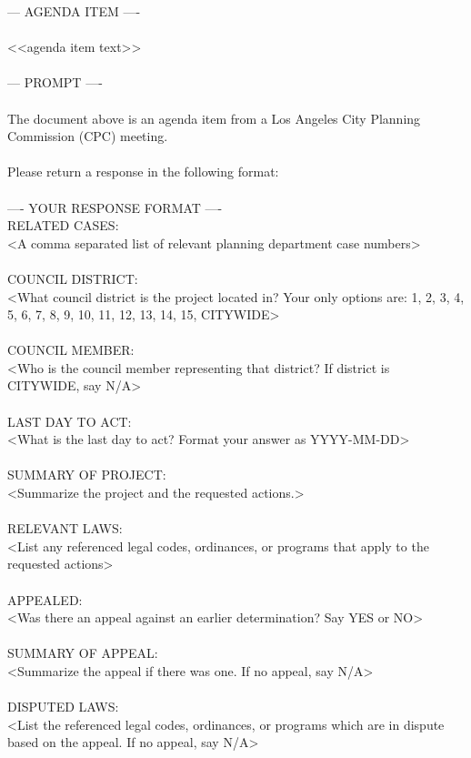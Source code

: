 --- AGENDA ITEM ----\\ 
\\ 
<<agenda item text>>\\ 
\\ 
--- PROMPT ----\\ 
\\ 
The document above is an agenda item from a Los Angeles City Planning Commission (CPC) meeting.\\ 
\\ 
Please return a response in the following format:\\ 
\\ 
---- YOUR RESPONSE FORMAT ----\\ 
RELATED CASES:\\ 
<A comma separated list of relevant planning department case numbers>\\ 
\\ 
COUNCIL DISTRICT:\\ 
<What council district is the project located in? Your only options are: 1, 2, 3, 4, 5, 6, 7, 8, 9, 10, 11, 12, 13, 14, 15, CITYWIDE>\\ 
\\ 
COUNCIL MEMBER:\\ 
<Who is the council member representing that district? If district is CITYWIDE, say N/A>\\ 
\\ 
LAST DAY TO ACT:\\ 
<What is the last day to act? Format your answer as YYYY-MM-DD>\\ 
\\ 
SUMMARY OF PROJECT:\\ 
<Summarize the project and the requested actions.>\\ 
\\ 
RELEVANT LAWS:\\ 
<List any referenced legal codes, ordinances, or programs that apply to the requested actions>\\ 
\\ 
APPEALED:\\ 
<Was there an appeal against an earlier determination? Say YES or NO>\\ 
\\ 
SUMMARY OF APPEAL:\\ 
<Summarize the appeal if there was one. If no appeal, say N/A>\\ 
\\ 
DISPUTED LAWS:\\ 
<List the referenced legal codes, ordinances, or programs which are in dispute based on the appeal. If no appeal, say N/A>